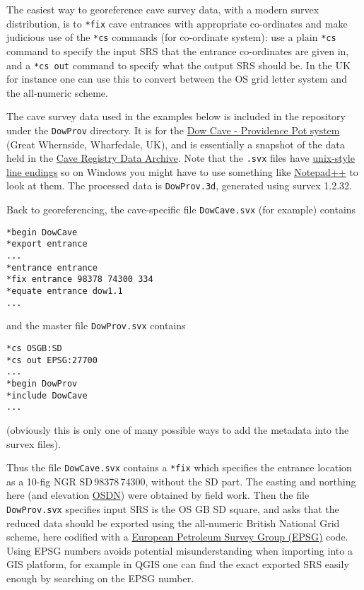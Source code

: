 \documentclass[]{article}
\begin{document}
The easiest way to georeference cave survey data, with a modern survex
distribution, is to \verb}*fix} cave entrances with appropriate
co-ordinates and make judicious use of the \verb}*cs} commands (for
co-ordinate system): use a plain \verb}*cs} command to specify the
input SRS that the entrance co-ordinates are given in, and a
\verb}*cs out} command to specify what the output SRS should be. In
the UK for instance one can use this to convert between the OS grid
letter system and the all-numeric scheme.

The cave survey data used in the examples below is included in the
repository under the \verb}DowProv} directory. It is for the
\href{http://www.mudinmyhair.co.uk/}{Dow Cave - Providence Pot system}
(Great Whernside, Wharfedale, UK), and is essentially a snapshot of the
data held in the \href{http://cave-registry.org.uk/}{Cave Registry Data
Archive}. Note that the \verb}.svx} files have
\href{https://en.wikipedia.org/wiki/Newline}{unix-style line endings} so
on Windows you might have to use something like
\href{https://notepad-plus-plus.org/}{Notepad{\small++}} to look at them. The
processed data is \verb}DowProv.3d}, generated using survex 1.2.32.

Back to georeferencing, the cave-specific file \verb}DowCave.svx} (for
example) contains

\begin{verbatim}
*begin DowCave
*export entrance
...
*entrance entrance
*fix entrance 98378 74300 334
*equate entrance dow1.1
...
\end{verbatim}

and the master file \verb}DowProv.svx} contains

\begin{verbatim}
*cs OSGB:SD
*cs out EPSG:27700
...
*begin DowProv
*include DowCave
...
\end{verbatim}

(obviously this is only one of many possible ways to add the metadata
into the survex files).

Thus the file \verb}DowCave.svx} contains a \verb}*fix} which
specifies the entrance location as a 10-fig NGR
SD\,98378\,74300, without the SD part. The easting and
northing here (and elevation
\href{https://en.wikipedia.org/wiki/Ordnance_datum}{OSDN}) were obtained
by field work. Then the file \verb}DowProv.svx} specifies input SRS is
the OS GB SD square, and asks that the reduced data should be exported
using the all-numeric British National Grid scheme, here codified with a
\href{http://spatialreference.org/}{European Petroleum Survey Group
(EPSG)} code. Using EPSG numbers avoids potential misunderstanding when
importing into a GIS platform, for example in QGIS one can find the
exact exported SRS easily enough by searching on the EPSG number.
\end{document}
